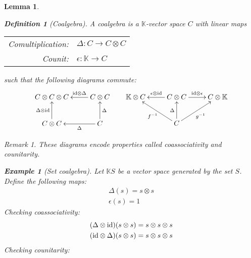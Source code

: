 \documentclass{article}
\newtheorem{Lemma}{Lemma}
\theoremstyle{definition}
\newtheorem{Definition}{Definition}
\newtheorem{Example}{Example}
\theoremstyle{remark}
\newtheorem*{Remark*}{Remark}
\theoremstyle{underline}
\theoremstyle{underline}
\newcommand{\id}{\mathrm{id}}
\begin{document}
\begin{Lemma}
	\begin{Definition}[Coalgebra]
		A \emph{coalgebra} is a $\mathbb K$-vector space $C$ with linear maps
		\begin{center}
			\begin{tabular}{rl}
		 		Comultiplication: & $\Delta \colon C \rightarrow C \otimes C$ \\
		 		Counit: & $ \epsilon \colon \mathbb K \rightarrow C$ 
		\end{tabular}
		\end{center}
		such that the following diagrams commute:
		\begin{equation*}
		\xymatrix{
			C \otimes C \otimes C & C \otimes C \ar[l]_-{\id \otimes \Delta} \\
			C \otimes C \ar[u]^-{\Delta \otimes \id} & C \ar[l]^-{\Delta} \ar[u]_-{\Delta}
		} \;\;\;\;\;\;
		\xymatrix{
			\mathbb K \otimes C  & C \otimes C \ar[l]_-{\epsilon \otimes \id} \ar[r]^-{\id \otimes \epsilon} & C \otimes \mathbb K  \\
			& C \ar[u]^-{\Delta} \ar[lu]^-{f^{-1}} \ar[ru]_-{g^{-1}} &	
		}
		\end{equation*}
	\end{Definition}
	\begin{Remark*}
		These diagrams encode properties called \emph{coassociativity} and \emph{counitarity}.
	\end{Remark*}
	\begin{Example}[Set coalgebra]
		Let $\mathbb K S$ be a vector space generated by the set $S$. Define the following maps:
		\begin{gather*}
			\Delta(s) = s\otimes s \\
			\epsilon(s) = 1 
		\end{gather*}
		Checking coassociativity:
		\begin{gather*}
			\pqty{\Delta \otimes \id} \pqty{s \otimes s} = s \otimes s \otimes s \\
			\pqty{\id \otimes \Delta} \pqty{s \otimes s} = s \otimes s \otimes s 
		\end{gather*}
		Checking counitarity:
	\end{Example}


\end{Lemma}
\end{document}
